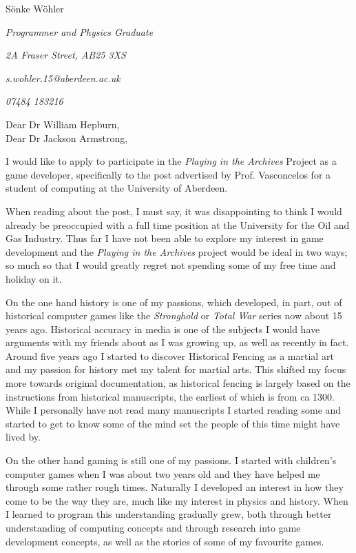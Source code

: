 \documentclass[paper=a4,fontsize=11pt]{scrartcl} %
\newcommand{\sepspace}{\vspace*{1em}}		%
\newcommand{\MyName}[1]{ %
  \Huge \usefont{OT1}{phv}{b}{n} \hfill #1
  \par \normalsize \normalfont}
\newcommand{\MySlogan}[5]{ %
  \large \usefont{OT1}{phv}{m}{n}\hfill \textit{#1} 
  \sepspace
  \par \normalsize \usefont{OT1}{phv}{m}{n}\hfill \textit{#2}
  \par \normalsize \usefont{OT1}{phv}{m}{n}\hfill \textit{#3}
  \par \normalsize \usefont{OT1}{phv}{m}{n}\hfill \textit{#4}
  \par \normalsize \usefont{OT1}{phv}{m}{n}\hfill \textit{#5}
  \par \normalsize \normalfont}
\begin{document}
  
  \MyName{S\"onke W\"ohler}
  \MySlogan{Programmer and Physics Graduate}{2A Fraser Street, AB25 3XS}{s.wohler.15@aberdeen.ac.uk}{07484 183216}{}
  
  \noindent
  Dear Dr William Hepburn, \\
  Dear Dr Jackson Armstrong,
  
  \sepspace
  
  \noindent
  I would like to apply to participate in the \textit{Playing in the Archives} Project as a game developer, specifically to the post advertised by Prof. Vasconcelos for a student of computing at the University of Aberdeen. 
  \sepspace
  
  \noindent
  When reading about the post, I must say, it was disappointing to think I would already be preoccupied with a full time position at the University for the Oil and Gas Industry. Thus far I have not been able to explore my interest in game development and the \textit{Playing in the Archives} project would be ideal in two ways; so much so that I would greatly regret not spending some of my free time and holiday on it.
  \sepspace
  
  \noindent
  On the one hand history is one of my passions, which developed, in part, out of historical computer games like the \textit{Stronghold} or \textit{Total War} series now about 15 years ago. Historical accuracy in media is one of the subjects I would have arguments with my friends about as I was growing up, as well as recently in fact. \\
  Around five years ago I started to discover Historical Fencing as a martial art and my passion for history met my talent for martial arts. This shifted my focus more towards original documentation, as historical fencing is largely based on the instructions from historical manuscripts, the earliest of which is from ca 1300. While I personally have not read many manuscripts I started reading some and started to get to know some of the mind set the people of this time might have lived by. 
  \sepspace
  
  \noindent
  On the other hand gaming is still one of my passions. I started with children's computer games when I was about two years old and they have helped me through some rather rough times. Naturally I developed an interest in how they come to be the way they are, much like my interest in physics and history. When I learned to program this understanding gradually grew, both through better understanding of computing concepts and through research into game development concepts, as well as the stories of some of my favourite games. 
  \sepspace
  
\end{document}
